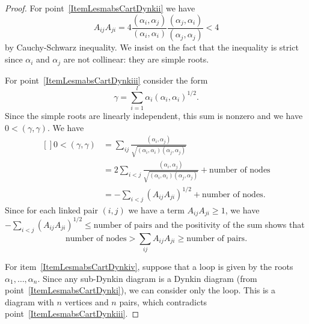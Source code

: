 \begin{proof}
    For point~\ref{ItemLesmabsCartDynkii} we have
    \begin{equation}
        A_{ij}A_{ji}=4\frac{ (\alpha_i,\alpha_j) }{ (\alpha_i,\alpha_i) }\frac{ (\alpha_j,\alpha_i) }{ (\alpha_j,\alpha_j) }<4
    \end{equation}
    by Cauchy-Schwarz inequality. We insist on the fact that the inequality is strict since \( \alpha_i\) and \( \alpha_j\) are not collinear: they are simple roots.

    For point~\ref{ItemLesmabsCartDynkiii} consider the form
    \begin{equation}
        \gamma=\sum_{i=1}^l\alpha_i(\alpha_i,\alpha_i)^{1/2}.
    \end{equation}
    Since the simple roots are linearly independent, this sum is nonzero and we have \( 0<(\gamma,\gamma)\). We have
    \begin{equation}
        \begin{aligned}[]
            0<(\gamma,\gamma)&=\sum_{ij}\frac{ (\alpha_i,\alpha_j) }{ \sqrt{(\alpha_i,\alpha_i)(\alpha_j,\alpha_j)} }\\
            &=2\sum_{i<j} \frac{ (\alpha_i,\alpha_j) }{ \sqrt{(\alpha_i,\alpha_i)(\alpha_j,\alpha_j)} }+\text{number of nodes}\\
            &=-\sum_{i<j}(A_{ij}A_{ji})^{1/2}+\text{number of nodes}.
        \end{aligned}
    \end{equation}
    Since for each linked pair \( (i,j)\) we have a term \( A_{ij}A_{ji}\geq 1\), we have \( -\sum_{i<j}(A_{ij}A_{ji})^{1/2}\leq \text{number of pairs}\) and the positivity of the sum shows that
    \begin{equation}
        \text{number of nodes}>\sum_{ij}A_{ij}A_{ji}\geq\text{number of pairs}.
    \end{equation}

    For item~\ref{ItemLesmabsCartDynkiv}, suppose that a loop is given by the roots \( \alpha_1,\ldots,\alpha_n\). Since any sub-Dynkin diagram is a Dynkin diagram (from point~\ref{ItemLesmabsCartDynki}), we can consider only the loop. This is a diagram with \( n\) vertices and \( n\) pairs, which contradicts point~\ref{ItemLesmabsCartDynkiii}.


\end{proof}
